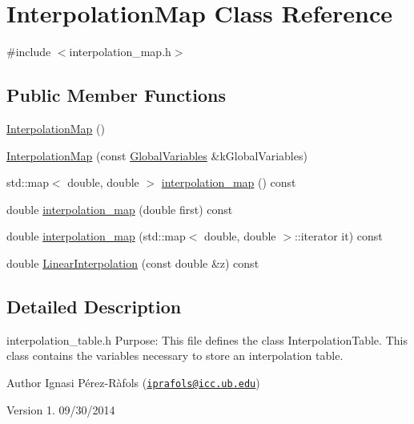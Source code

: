 \hypertarget{class_interpolation_map}{\section{Interpolation\-Map Class Reference}
\label{class_interpolation_map}
}


{\ttfamily \#include $<$interpolation\-\_\-map.\-h$>$}

\subsection*{Public Member Functions}
\begin{DoxyCompactItemize}
\item 
\hyperlink{class_interpolation_map_aa0ad25410dcf13311c924efe5c89279d}{Interpolation\-Map} ()
\item 
\hyperlink{class_interpolation_map_abd3dd531704a6cfae73f6ec03341d669}{Interpolation\-Map} (const \hyperlink{class_global_variables}{Global\-Variables} \&k\-Global\-Variables)
\item 
std\-::map$<$ double, double $>$ \hyperlink{class_interpolation_map_adc226eb42a78f6a2c271ed9cca173ba6}{interpolation\-\_\-map} () const 
\item 
double \hyperlink{class_interpolation_map_a7de7636948886560d9872a42a616c45b}{interpolation\-\_\-map} (double first) const 
\item 
double \hyperlink{class_interpolation_map_abeb81577ae71d6a6bfd0cbe1225b7e44}{interpolation\-\_\-map} (std\-::map$<$ double, double $>$\-::iterator it) const 
\item 
double \hyperlink{class_interpolation_map_a3a13f78a411bd200ff1a4094252c23a3}{Linear\-Interpolation} (const double \&z) const 
\end{DoxyCompactItemize}


\subsection{Detailed Description}
interpolation\-\_\-table.\-h Purpose\-: This file defines the class Interpolation\-Table. This class contains the variables necessary to store an interpolation table.

\begin{DoxyAuthor}{Author}
Ignasi Pérez-\/\-Ràfols (\href{mailto:iprafols@icc.ub.edu}{\tt iprafols@icc.\-ub.\-edu}) 
\end{DoxyAuthor}
\begin{DoxyVersion}{Version}
1. 09/30/2014 
\end{DoxyVersion}


